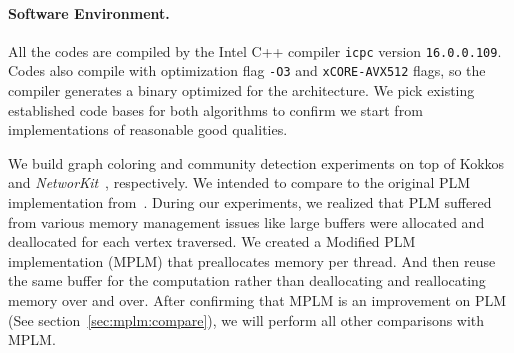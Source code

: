 \documentclass[default,iicol]{sn-jnl}%
\theoremstyle{thmstyleone}%
\theoremstyle{thmstyletwo}%
\theoremstyle{thmstylethree}%
\begin{document}
\paragraph{Software Environment.}
All the codes are compiled by the Intel C++ compiler \texttt{icpc} version \texttt{16.0.0.109}. Codes also compile 
with optimization flag \texttt{-O3} and \texttt{xCORE-AVX512} flags, so the compiler generates a binary optimized  for the architecture. 
We pick existing established code bases for both algorithms to confirm we start from implementations of reasonable good qualities.

We build graph coloring and community detection experiments on top of Kokkos~\cite{edwards2014kokkos} and 
\textit{NetworKit}~\cite{staudt2014networkit}, respectively. We intended to compare to the original PLM implementation
from~\cite{plm}.  During our experiments, we realized that PLM suffered from various memory management issues like 
large buffers were allocated and deallocated for each vertex traversed. We created a Modified PLM implementation (MPLM) 
that preallocates memory per thread. And then reuse the same buffer for the computation rather than deallocating and 
reallocating memory over and over. After confirming that MPLM is an improvement on PLM (See section~\ref{sec:mplm:compare}), 
we will perform all other comparisons with MPLM.
\end{document}
